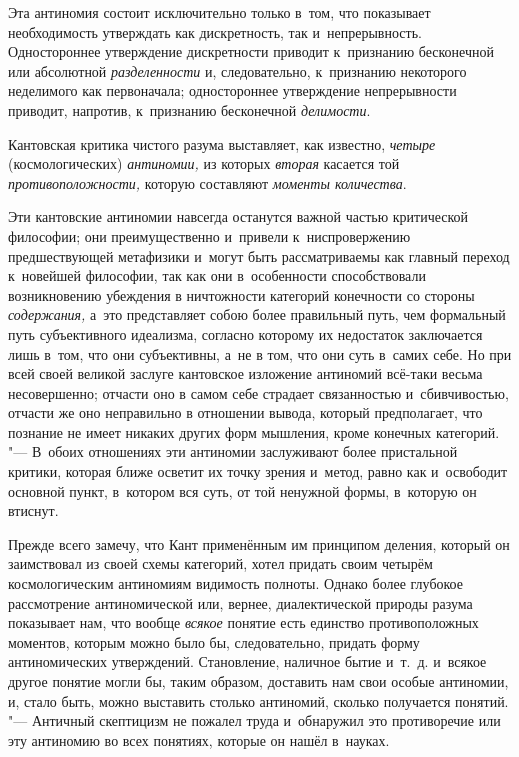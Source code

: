 Эта антиномия состоит исключительно только в~том, что показывает необходимость
утверждать как дискретность, так и~непрерывность. Одностороннее утверждение
дискретности приводит к~признанию бесконечной или абсолютной
{\em разделенности} и, следовательно, к~признанию некоторого неделимого как
первоначала; одностороннее утверждение непрерывности приводит, напротив,
к~признанию бесконечной {\em делимости}.

Кантовская критика чистого разума выставляет, как известно, {\em четыре}
(космологических) {\em антиномии,} из которых {\em вторая} касается той
{\em противоположности,} которую составляют {\em моменты количества}.

Эти кантовские антиномии навсегда останутся важной частью критической
философии; они преимущественно и~привели к~ниспровержению предшествующей
метафизики и~могут быть рассматриваемы как главный переход к~новейшей
философии, так как они в~особенности способствовали возникновению убеждения
в ничтожности категорий конечности со стороны
{\em содержания,} а~это представляет собою более
правильный путь, чем формальный путь субъективного идеализма, согласно
которому их недостаток заключается лишь в~том, что они субъективны, а~не в
том, что они суть в~самих себе. Но при всей своей великой заслуге
кантовское изложение антиномий всё-таки весьма несовершенно; отчасти оно в
самом себе страдает связанностью и~сбивчивостью, отчасти же оно неправильно
в отношении вывода, который предполагает, что познание не имеет никаких
других форм мышления, кроме конечных категорий. "--- В~обоих отношениях эти
антиномии заслуживают более пристальной критики, которая ближе осветит их
точку зрения и~метод, равно как и~освободит основной пункт, в~котором вся
суть, от той ненужной формы, в~которую он втиснут.

Прежде всего замечу, что Кант применённым им принципом деления, который он
заимствовал из своей схемы категорий, хотел придать своим четырём
космологическим антиномиям видимость полноты. Однако более глубокое
рассмотрение антиномической или, вернее, диалектической природы разума
показывает нам, что вообще {\em всякое} понятие есть
единство противоположных моментов, которым можно было бы, следовательно,
придать форму антиномических утверждений. Становление, наличное бытие
и~т.~д. и~всякое другое понятие могли бы, таким образом, доставить нам свои
особые антиномии, и, стало быть, можно выставить столько антиномий, сколько
получается понятий. "--- Античный скептицизм не пожалел труда и~обнаружил это
противоречие или эту антиномию во всех понятиях, которые он нашёл в~науках.

